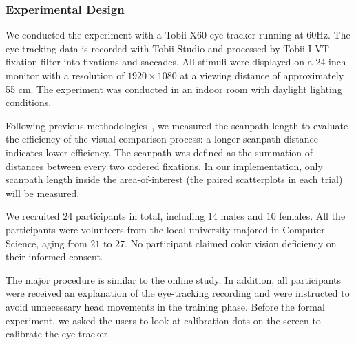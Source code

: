 \subsubsection{Experimental Design}
\vspace{.3em}
We conducted the experiment with a Tobii X60 eye tracker running at 60Hz. The eye tracking data is recorded with Tobii Studio and processed by Tobii I-VT fixation filter into fixations and saccades.
All stimuli were displayed on a 24-inch monitor with a resolution of $1920 \times 1080$ at a viewing distance of approximately 55 cm.
The experiment was conducted in an indoor room with daylight lighting conditions.


\vspace{.3em}
Following previous methodologies~\cite{Goldberg1996,Goldberg2010,Fua2017}, we measured the scanpath length to evaluate the efficiency of the visual comparison process: a longer scanpath distance indicates lower efficiency.
The scanpath was defined as the summation of distances between every two ordered fixations.
In our implementation, only scanpath length inside the area-of-interest (the paired scatterplots in each trial) will be measured.


\vspace{.3em}
We recruited $24$ participants in total, including $14$ males and $10$ females. All the participants were volunteers from the local university majored in Computer Science, aging from $21$ to $27$.
No participant claimed  color vision deficiency on their informed consent.


\vspace{.3em}
The major procedure is similar to the online study. In addition, all  participants were received an explanation of the eye-tracking recording and were instructed to avoid unnecessary head movements in the training phase. Before the formal experiment, we asked the users to look at calibration dots on the screen to calibrate the eye tracker.

